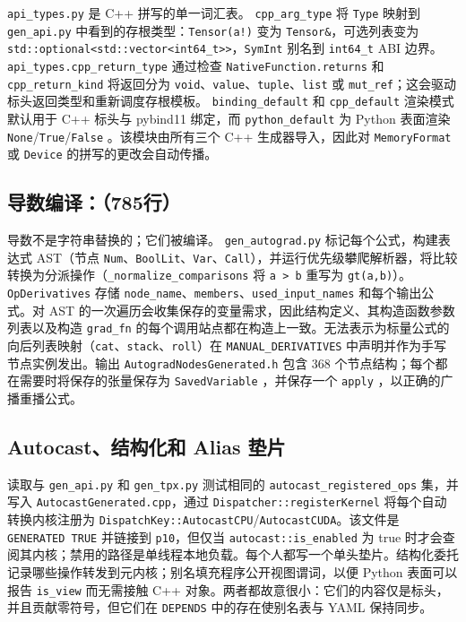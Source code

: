 \texttt{api\_types.py} 是 C++ 拼写的单一词汇表。 \texttt{cpp\_arg\_type} 将 \texttt{Type} 映射到 \texttt{gen\_api.py} 中看到的存根类型：\texttt{Tensor(a!)} 变为 \texttt{Tensor\&}，可选列表变为 \texttt{std::optional<std::vector<int64\_t>>}，\texttt{SymInt} 别名到 \texttt{int64\_t} ABI 边界。 \texttt{api\_types.cpp\_return\_type} 通过检查 \texttt{NativeFunction.returns} 和 \texttt{cpp\_return\_kind} 将返回分为 \texttt{void}、\texttt{value}、\texttt{tuple}、\texttt{list} 或 \texttt{mut\_ref}；这会驱动标头返回类型和重新调度存根模板。 \texttt{binding\_default} 和 \texttt{cpp\_default} 渲染模式默认用于 C++ 标头与 pybind11 绑定，而 \texttt{python\_default} 为 Python 表面渲染 \texttt{None}/\texttt{True}/\texttt{False} 。该模块由所有三个 C++ 生成器导入，因此对 \texttt{MemoryFormat} 或 \texttt{Device} 的拼写的更改会自动传播。

\subsection{导数编译：（785行）}

导数不是字符串替换的；它们被编译。 \texttt{gen\_autograd.py} 标记每个公式，构建表达式 AST（节点 \texttt{Num}、\texttt{BoolLit}、\texttt{Var}、\texttt{Call}），并运行优先级攀爬解析器，将比较转换为分派操作（\texttt{\_normalize\_comparisons} 将 \texttt{a > b} 重写为 \texttt{gt(a,b)}）。 \texttt{OpDerivatives} 存储 \texttt{node\_name}、\texttt{members}、\texttt{used\_input\_names} 和每个输出公式。对 AST 的一次遍历会收集保存的变量需求，因此结构定义、其构造函数参数列表以及构造 \texttt{grad\_fn} 的每个调用站点都在构造上一致。无法表示为标量公式的向后列表映射（\texttt{cat}、\texttt{stack}、\texttt{roll}）在 \texttt{MANUAL\_DERIVATIVES} 中声明并作为手写节点实例发出。输出 \texttt{AutogradNodesGenerated.h} 包含 368 个节点结构；每个都在需要时将保存的张量保存为 \texttt{SavedVariable} ，并保存一个 \texttt{apply} ，以正确的广播重播公式。

\subsection{Autocast、结构化和 Alias 垫片}

读取与 \texttt{gen\_api.py} 和 \texttt{gen\_tpx.py} 测试相同的 \texttt{autocast\_registered\_ops} 集，并写入 \texttt{AutocastGenerated.cpp}，通过 \texttt{Dispatcher::registerKernel} 将每个自动转换内核注册为 \texttt{DispatchKey::AutocastCPU}/\texttt{AutocastCUDA}。该文件是 \texttt{GENERATED TRUE} 并链接到 \texttt{p10}，但仅当 \texttt{autocast::is\_enabled} 为 true 时才会查阅其内核；禁用的路径是单线程本地负载。每个人都写一个单头垫片。结构化委托记录哪些操作转发到元内核；别名填充程序公开视图谓词，以便 Python 表面可以报告 \texttt{is\_view} 而无需接触 C++ 对象。两者都故意很小：它们的内容仅是标头，并且贡献零符号，但它们在 \texttt{DEPENDS} 中的存在使别名表与 YAML 保持同步。

